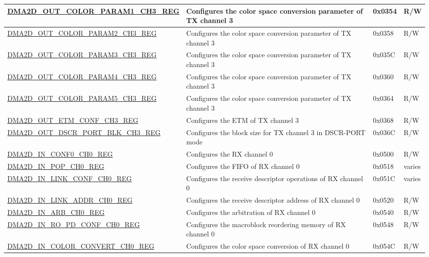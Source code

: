 \begin{longtable}{ | p{7cm} | p{11.5cm} | p{1.3cm} | p{2cm} | }
\hyperref[regdesc:DMA2DOUTCOLORPARAM1CHNREG]{DMA2D\_OUT\_COLOR\_PARAM1\_CH3\_REG} & Configures the color space conversion parameter of TX channel 3 & 0x0354 & R/W \\ \hline
\hyperref[regdesc:DMA2DOUTCOLORPARAM2CHNREG]{DMA2D\_OUT\_COLOR\_PARAM2\_CH3\_REG} & Configures the color space conversion parameter of TX channel 3 & 0x0358 & R/W \\ \hline
\hyperref[regdesc:DMA2DOUTCOLORPARAM3CHNREG]{DMA2D\_OUT\_COLOR\_PARAM3\_CH3\_REG} & Configures the color space conversion parameter of TX channel 3 & 0x035C & R/W \\ \hline
\hyperref[regdesc:DMA2DOUTCOLORPARAM4CHNREG]{DMA2D\_OUT\_COLOR\_PARAM4\_CH3\_REG} & Configures the color space conversion parameter of TX channel 3 & 0x0360 & R/W \\ \hline
\hyperref[regdesc:DMA2DOUTCOLORPARAM5CHNREG]{DMA2D\_OUT\_COLOR\_PARAM5\_CH3\_REG} & Configures the color space conversion parameter of TX channel 3 & 0x0364 & R/W \\ \hline
\hyperref[regdesc:DMA2DOUTETMCONFCHNREG]{DMA2D\_OUT\_ETM\_CONF\_CH3\_REG} & Configures the ETM of TX channel 3 & 0x0368 & R/W \\ \hline
\hyperref[regdesc:DMA2DOUTDSCRPORTBLKCHNREG]{DMA2D\_OUT\_DSCR\_PORT\_BLK\_CH3\_REG} & Configures the block size for TX channel 3 in DSCR-PORT mode & 0x036C & R/W \\ \hline
\hyperref[regdesc:DMA2DINCONF0CHNREG]{DMA2D\_IN\_CONF0\_CH0\_REG} & Configures the RX channel 0 & 0x0500 & R/W \\ \hline
\hyperref[regdesc:DMA2DINPOPCHNREG]{DMA2D\_IN\_POP\_CH0\_REG} & Configures the FIFO of RX channel 0 & 0x0518 & varies \\ \hline
\hyperref[regdesc:DMA2DINLINKCONFCHNREG]{DMA2D\_IN\_LINK\_CONF\_CH0\_REG} & Configures the receive descriptor operations of RX channel 0 & 0x051C & varies \\ \hline
\hyperref[regdesc:DMA2DINLINKADDRCHNREG]{DMA2D\_IN\_LINK\_ADDR\_CH0\_REG} & Configures the receive descriptor address of RX channel 0 & 0x0520 & R/W \\ \hline
\hyperref[regdesc:DMA2DINARBCHNREG]{DMA2D\_IN\_ARB\_CH0\_REG} & Configures the arbitration of RX channel 0 & 0x0540 & R/W \\ \hline
\hyperref[regdesc:DMA2DINROPDCONFCH0REG]{DMA2D\_IN\_RO\_PD\_CONF\_CH0\_REG} & Configures the macroblock reordering memory of RX channel 0 & 0x0548 & R/W \\ \hline
\hyperref[regdesc:DMA2DINCOLORCONVERTCH0REG]{DMA2D\_IN\_COLOR\_CONVERT\_CH0\_REG} & Configures the color space conversion of RX channel 0 & 0x054C & R/W \\ \hline

\end{longtable}
